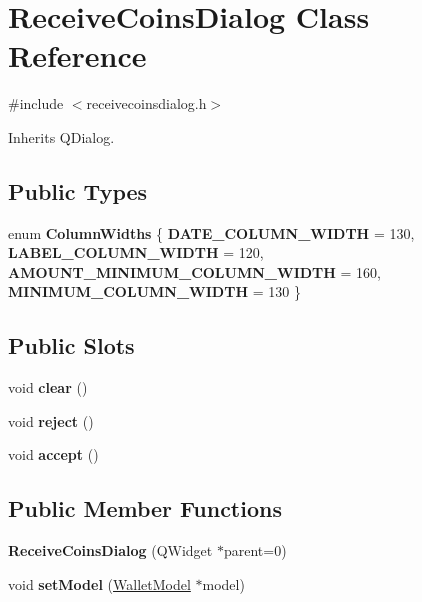 \hypertarget{class_receive_coins_dialog}{}\section{Receive\+Coins\+Dialog Class Reference}
\label{class_receive_coins_dialog}


{\ttfamily \#include $<$receivecoinsdialog.\+h$>$}



Inherits Q\+Dialog.

\subsection*{Public Types}
\begin{DoxyCompactItemize}
\item 
\mbox{\label{class_receive_coins_dialog_a348824c8475841e6e0cb35fdf9090656}} 
enum {\bfseries Column\+Widths} \{ {\bfseries D\+A\+T\+E\+\_\+\+C\+O\+L\+U\+M\+N\+\_\+\+W\+I\+D\+TH} = 130, 
{\bfseries L\+A\+B\+E\+L\+\_\+\+C\+O\+L\+U\+M\+N\+\_\+\+W\+I\+D\+TH} = 120, 
{\bfseries A\+M\+O\+U\+N\+T\+\_\+\+M\+I\+N\+I\+M\+U\+M\+\_\+\+C\+O\+L\+U\+M\+N\+\_\+\+W\+I\+D\+TH} = 160, 
{\bfseries M\+I\+N\+I\+M\+U\+M\+\_\+\+C\+O\+L\+U\+M\+N\+\_\+\+W\+I\+D\+TH} = 130
 \}
\end{DoxyCompactItemize}
\subsection*{Public Slots}
\begin{DoxyCompactItemize}
\item 
\mbox{\label{class_receive_coins_dialog_aaea0511f0ab43f1d2b23f8684d1edfc3}} 
void {\bfseries clear} ()
\item 
\mbox{\label{class_receive_coins_dialog_aeed78dd55cfc9def8b1b3ec3cec4bc11}} 
void {\bfseries reject} ()
\item 
\mbox{\label{class_receive_coins_dialog_aa34d81582b9a1c4311e5cf551aab415e}} 
void {\bfseries accept} ()
\end{DoxyCompactItemize}
\subsection*{Public Member Functions}
\begin{DoxyCompactItemize}
\item 
\mbox{\label{class_receive_coins_dialog_a0c982b94b7f23da8f208d09904352f89}} 
{\bfseries Receive\+Coins\+Dialog} (Q\+Widget $\ast$parent=0)
\item 
\mbox{\label{class_receive_coins_dialog_a856e5bbe280d792004e97e703f42c7f8}} 
void {\bfseries set\+Model} (\mbox{\hyperlink{class_wallet_model}{Wallet\+Model}} $\ast$model)
\end{DoxyCompactItemize}
